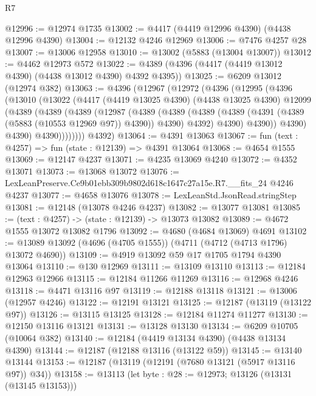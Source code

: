 \begin{lexlean}{R7}
\begin{coremodule}
@12996 := @12974 @1735
@13002 := @4417 (@4419 @12996 @4390) (@4438 @12996 @4390)
@13004 := @12132 @4246 @12969
@13006 := @7476 @4257 @28
@13007 := @13006 @12958
@13010 := @13002 (@5883 (@13004 @13007))
@13012 := @4462 @12973 @572
@13022 := @4389 (@4396 (@4417 (@4419 @13012 @4390) (@4438 @13012 @4390) @4392 @4395))
@13025 := @6209 @13012 (@12974 @382)
@13063 := @4396
    (@12967
      (@12972
        (@4396
          (@12995
            (@4396
              (@13010
                (@13022
                  (@4417
                    (@4419 @13025 @4390)
                    (@4438 @13025 @4390)
                    @12099
                    (@4389
                      (@4389
                        (@4389
                          (@12987
                            (@4389
                              (@4389
                                (@4389
                                  (@4389 (@4391 (@4389 (@5883 (@10553 @12969 @97)) @4390)) @4390)
                                  @4392)
                                @4390)
                              @4390))
                          @4390)
                        @4390)
                      @4390))))))))
      @4392)
@13064 := @4391 @13063
@13067 := fun (text : @4257) => fun (state : @12139) => @4391 @13064
@13068 := @4654 @1555
@13069 := @12147 @4237
@13071 := @4235 @13069 @4240
@13072 := @4352 @13071
@13073 := @13068 @13072
@13076 := LexLeanPreserve.Ce9b01ebb309b9802d618c1647c27a15e.R7.__fits_24 @4246 @4237
@13077 := @4658 @13076
@13078 := LexLeanStd.JsonRead.stringStep
@13081 := @12148 (@13078 @4246 @4237)
@13082 := @13077 @13081
@13085 := (text : @4257) -> (state : @12139) -> @13073 @13082
@13089 := @4672 @1555 @13072 @13082 @1796
@13092 := @4680 (@4684 @13069) @4691
@13102 := @13089 @13092 (@4696 (@4705 @1555)) (@4711 (@4712 (@4713 @1796) @13072 @4690))
@13109 := @4919 @13092 @59 @17 @1705 @1794 @4390 @13064
@13110 := @130 @12969
@13111 := @13109 @13110
@13113 := @12184 @12963 @12966
@13115 := @12184 @11266 @11269
@13116 := @12968 @4246
@13118 := @4471 @13116 @97
@13119 := @12188 @13118
@13121 := @13006 (@12957 @4246)
@13122 := @12191 @13121
@13125 := @12187 (@13119 (@13122 @97))
@13126 := @13115 @13125
@13128 := @12184 @11274 @11277
@13130 := @12150 @13116 @13121
@13131 := @13128 @13130
@13134 := @6209 @10705 (@10064 @382)
@13140 := @12184 (@4419 @13134 @4390) (@4438 @13134 @4390)
@13144 := @12187 (@12188 @13116 (@13122 @59))
@13145 := @13140 @13144
@13153 := @12187 (@13119 (@12191 (@7680 @13121 (@5917 @13116 @97)) @34))
@13158 := @13113 (let byte : @28 := @12973; @13126 (@13131 (@13145 @13153)))

\end{coremodule}
\end{lexlean}
